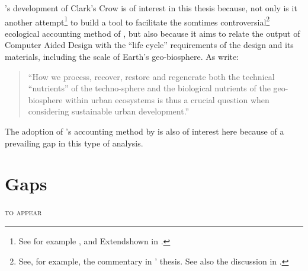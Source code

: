 \citeauthor{keena_clark_2018}'s development of Clark's Crow is of interest in this thesis because, not only is it another attempt\footnote{See for example \cite{valyi_user_2005, valyi_emergy_2004-4, valyi_emergy_2004-3, valyi_emergy_2004-2, valyi_emergy_2004, valyi_emergy_2004-1}, and Extend\texttrademark  shown in \cite{odum_modeling_2000}.} to build a tool to facilitate the somtimes controversial\footnote{See, for example, the commentary in ' thesis. See also the discussion in \cite{baktari_emergy_2000, tennenbaum_network_1988, tennenbaum_emergy_2015, le_corre_odumtennenbaumbrown_2015, tennenbaum_odumtennenbaumbrown_2015}.} ecological accounting method of \cite{odum_environmental_1996}, but also because it aims to relate the output of Computer Aided Design with the ``life cycle'' requirements of the design and its materials, including the scale of Earth's geo-biosphere. As \cite{keena_clark_2018} write:

\begin{quotation}
    ``How we process, recover, restore and regenerate both the technical “nutrients” of the techno-sphere and the biological nutrients of the geo-biosphere within urban ecosystems is thus a crucial question when considering sustainable urban development.'' \cite[p.~42]{keena_clark_2018}
\end{quotation}

The adoption of \cite{odum_environmental_1996}'s accounting method by \citeauthor{keena_clark_2018} is also of interest here because of a prevailing gap in this type of analysis. 

\section{Gaps}

\textsc{to appear}


